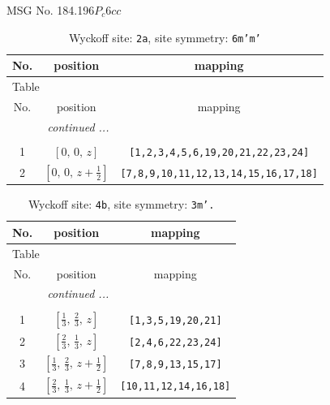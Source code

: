 \documentclass[fleqn,8pt]{jsarticle}
\begin{document}
\setcounter{MaxMatrixCols}{32}

\renewcommand{\tablename}{Table~}
\renewcommand{\figurename}{Figure~}
\begin{center}
\LARGE
MSG No. 184.196\quad$P_{c}6cc$
\end{center}
\renewcommand{\arraystretch}{1.2}
\begin{longtable}{ccc}
\caption{Wyckoff site: {\tt 2a}, site symmetry: {\tt 6m'm'}}
 \\
 \hline \hline
No. & position & mapping \\ \hline \endfirsthead

\multicolumn{2}{l}{\tablename\ \thetable{}} \\
 \hline \hline
No. & position & mapping \\ \hline \endhead

 \hline \hline
\multicolumn{2}{r}{\footnotesize\it continued ...} \\ \endfoot

 \hline \hline
\multicolumn{2}{r}{} \\ \endlastfoot

1 & $\left[ 0,\, 0,\, z \right]$ & {\tt [1,2,3,4,5,6,19,20,21,22,23,24]} \\ \hline
2 & $\left[ 0,\, 0,\, z + \frac{1}{2} \right]$ & {\tt [7,8,9,10,11,12,13,14,15,16,17,18]} \\
\end{longtable}
\renewcommand{\arraystretch}{1.2}
\begin{longtable}{ccc}
\caption{Wyckoff site: {\tt 4b}, site symmetry: {\tt 3m'.}}
 \\
 \hline \hline
No. & position & mapping \\ \hline \endfirsthead

\multicolumn{2}{l}{\tablename\ \thetable{}} \\
 \hline \hline
No. & position & mapping \\ \hline \endhead

 \hline \hline
\multicolumn{2}{r}{\footnotesize\it continued ...} \\ \endfoot

 \hline \hline
\multicolumn{2}{r}{} \\ \endlastfoot

1 & $\left[ \frac{1}{3},\, \frac{2}{3},\, z \right]$ & {\tt [1,3,5,19,20,21]} \\ \hline
2 & $\left[ \frac{2}{3},\, \frac{1}{3},\, z \right]$ & {\tt [2,4,6,22,23,24]} \\ \hline
3 & $\left[ \frac{1}{3},\, \frac{2}{3},\, z + \frac{1}{2} \right]$ & {\tt [7,8,9,13,15,17]} \\ \hline
4 & $\left[ \frac{2}{3},\, \frac{1}{3},\, z + \frac{1}{2} \right]$ & {\tt [10,11,12,14,16,18]} \\
\end{longtable}
\end{document}
